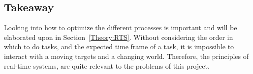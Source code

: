 \subsection{Takeaway}
Looking into how to optimize the different processes is important and will be elaborated upon in Section~\ref{Theory:RTS}.
Without considering the order in which to do tasks, and the expected time frame of a task, it is impossible to interact with a moving targets and a changing world. 
Therefore, the principles of real-time systems, are quite relevant to the problems of this project.

